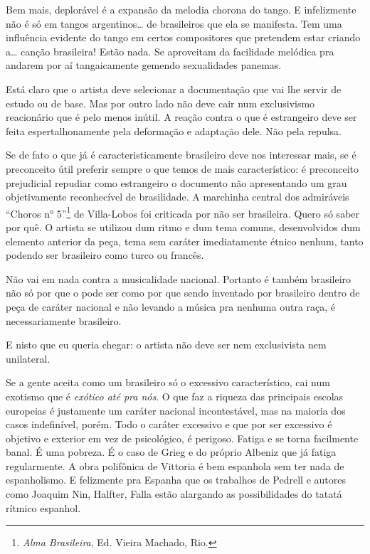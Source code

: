 Bem mais, deplorável é a expansão da melodia chorona do tango. E
infelizmente não é só em tangos argentinos\ldots{} de brasileiros que ela se
manifesta. Tem uma influência evidente do tango em certos compositores
que pretendem estar criando a\ldots{} canção brasileira! Estão nada. Se
aproveitam da facilidade melódica pra andarem por aí tangaicamente
gemendo sexualidades panemas.

Está claro que o artista deve selecionar a documentação que vai lhe
servir de estudo ou de base. Mas por outro lado não deve cair num
exclusivismo reacionário que é pelo menos inútil. A reação contra o que
é estrangeiro deve ser feita espertalhonamente pela deformação e
adaptação dele. Não pela repulsa.

Se de fato o que já é caracteristicamente brasileiro deve nos interessar
mais, se é preconceito útil preferir sempre o que temos de mais
característico: é preconceito prejudicial repudiar como estrangeiro o
documento não apresentando um grau objetivamente reconhecível de
brasilidade. A marchinha central dos admiráveis ``Choros n° 5''\footnote{\textit{Alma Brasileira}, Ed. Vieira Machado, Rio.} de
Villa-Lobos foi criticada por
não ser brasileira. Quero só saber por quê. O artista se utilizou dum
ritmo e dum tema comuns, desenvolvidos dum elemento anterior da peça,
tema sem caráter imediatamente étnico nenhum, tanto podendo ser
brasileiro como turco ou francês.

Não vai em nada contra a musicalidade nacional. Portanto é também
brasileiro não só por que o pode ser como por que sendo inventado por
brasileiro dentro de peça de caráter nacional e não levando a música pra
nenhuma outra raça, é necessariamente brasileiro.

E nisto que eu queria chegar: o artista não deve ser nem exclusivista
nem unilateral.

Se a gente aceita como um brasileiro só o excessivo característico, cai
num exotismo que é \emph{exótico até pra nós}. O que faz a riqueza das
principais escolas europeias é justamente um caráter nacional
incontestável, mas na maioria dos casos indefinível, porém. Todo o
caráter excessivo e que por ser excessivo é objetivo e exterior em vez
de psicológico, é perigoso. Fatiga e se torna facilmente banal. É uma
pobreza. É o caso de Grieg e do próprio Albeniz que já fatiga
regularmente. A obra polifônica de Vittoria é bem espanhola sem ter nada
de espanholismo. E felizmente pra Espanha que os trabalhos de Pedrell e
autores como Joaquim Nin, Halfter, Falla estão alargando as
possibilidades do tatatá rítmico espanhol.

